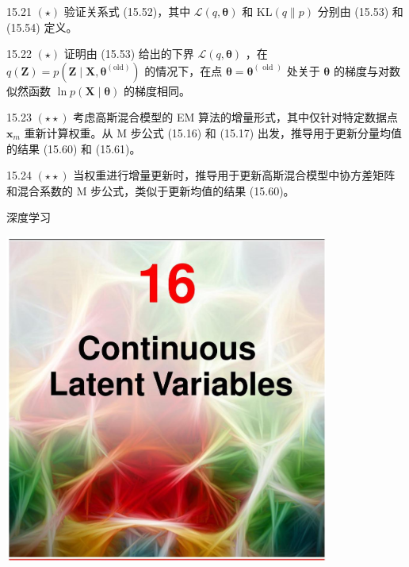 \documentclass[10pt]{report}
\begin{document}
15.21 \(\left( \star \right)\) 验证关系式 (15.52)，其中 \(\mathcal{L}\left( {q,\mathbf{\theta }}\right)\) 和 \(\mathrm{{KL}}\left( {q\parallel p}\right)\) 分别由 (15.53) 和 (15.54) 定义。

15.22 \(\left( \star \right)\) 证明由 (15.53) 给出的下界 \(\mathcal{L}\left( {q,\mathbf{\theta }}\right)\) ，在 \(q\left( \mathbf{Z}\right)  = p\left( {\mathbf{Z} \mid  \mathbf{X},{\mathbf{\theta }}^{\left( \mathrm{{old}}\right) }}\right)\) 的情况下，在点 \(\mathbf{\theta } = {\mathbf{\theta }}^{\left( \text{ old }\right) }\) 处关于 \(\mathbf{\theta }\) 的梯度与对数似然函数 \(\ln p\left( {\mathbf{X} \mid  \mathbf{\theta }}\right)\) 的梯度相同。

15.23 \(\left( {\star  \star  }\right)\) 考虑高斯混合模型的 EM 算法的增量形式，其中仅针对特定数据点 \({\mathbf{x}}_{m}\) 重新计算权重。从 M 步公式 (15.16) 和 (15.17) 出发，推导用于更新分量均值的结果 (15.60) 和 (15.61)。

15.24 \(\left( {\star  \star  }\right)\) 当权重进行增量更新时，推导用于更新高斯混合模型中协方差矩阵和混合系数的 M 步公式，类似于更新均值的结果 (15.60)。

深度学习

\begin{center}
\includegraphics[max width=0.8\textwidth]{images/0194e279-9b28-703a-88f4-c3ac21e2010d_514_473_348_1076_1089_0.jpg}
\end{center}
\hspace*{3em} 
\end{document}
